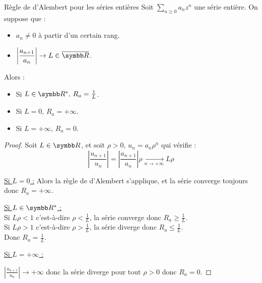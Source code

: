 \begin{theoreme}{Règle de d'Alembert pour les séries entières}{}
    Soit $\sum_{n \geqslant 0} a_n z^n$ une série entière. On suppose que : 
    \begin{itemize}
        \item $a_n \neq 0$ à partir d'un certain rang.
        \item $\displaystyle \left| \frac{a_{n + 1}}{a_n} \right| \to L \in \overline{\R}$.
    \end{itemize}

    Alors :
    \begin{itemize}
        \item Si $L \in \R^*, \, R_a = \frac 1 L$.
        \item Si $L = 0, \, R_a = +\infty$.
        \item Si $L = +\infty, \, R_a = 0$.
    \end{itemize}
\end{theoreme}


\begin{proof}
    Soit $L \in \R$, et soit $\rho > 0$, $u_n = a_n \rho^n$ qui vérifie :
    \[ \left| \frac{u_{n + 1}}{u_n} \right| = \left| \frac{a_{n + 1}}{a_n} \right| \rho \xrightarrow[n \to + \infty ]{} L \rho \]

    \uline{Si $L = 0$ :} Alors la règle de d'Alembert s'applique, et la série converge toujours 
    donc $R_a = +\infty$.

    \uline{Si $L \in \R^*$ :} \\
    \avspace Si $L \rho < 1$ c'est-à-dire $\rho < \frac 1 L$, la série converge donc $R_a \geqslant \frac 1 L$. \\
    Si $L \rho > 1$ c'est-à-dire $\rho > \frac 1 L$, la série diverge donc $R_a \leqslant \frac 1 L$. \\
    Donc $R_a = \frac 1 L$.

    \uline{Si $L = +\infty$ :} 

    \avspace $\displaystyle \left| \frac{u_{n + 1}}{u_n } \right| \to + \infty$ donc la série diverge 
    pour tout $\rho > 0$ donc $R_a = 0$.
\end{proof}

